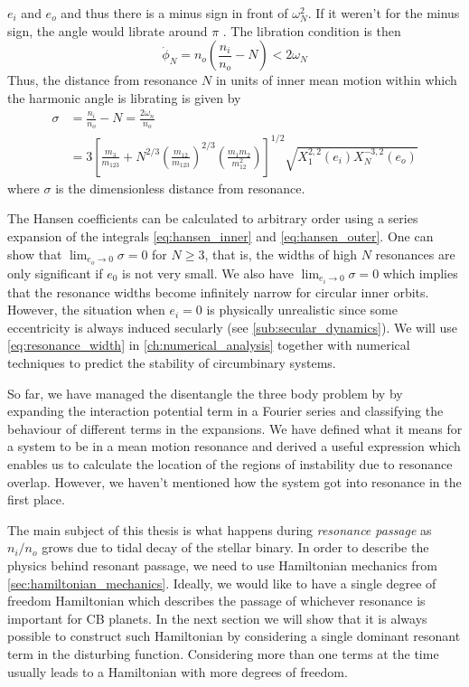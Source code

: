 \documentclass[ twoside,openright,titlepage,numbers=noenddot,headinclude,%
                footinclude=true,cleardoublepage=empty,abstractoff, %
                BCOR=5mm,paper=a4,fontsize=11pt,%
                american,%
                ]{scrreprt}
\begin{document}
$e_i$ and $e_o$ and thus there is a minus sign in front
of $\omega_N^2$. If it weren't for the minus sign, the 
angle would librate around $\pi$ \cite{Mardling2013}.
The libration condition is then
\begin{equation}
    \dot{\phi}_N=n_o\left( \frac{n_i}{n_o} -N\right)<2\omega_N
\end{equation}
Thus, the distance from resonance $N$ in units of inner mean motion
within which the harmonic angle is librating is given by
\begin{equation}
    \begin{aligned}
        \sigma&=\frac{n_i}{n_o} -N= \frac{2\omega_n}{n_o}\\ 
        &= 3\left[ \frac{m_3}{m_{123}} +
    N^{2/3}\left( \frac{m_{12}}{m_{123}}
        \right)^{2/3}\left( \frac{m_1m_2}{m_{12}^2} \right)\right]^{1/2}
        \sqrt{X^{2,2}_1(e_i)X^{-3,2}_N(e_o)}
    \end{aligned}
    \label{eq:resonance_width}
\end{equation}
where $\sigma$ is the dimensionless distance from resonance. 

The Hansen
coefficients can be calculated to arbitrary order using a series expansion
of the integrals \ref{eq:hansen_inner} and \ref{eq:hansen_outer}. One can
show that $\lim_{e_o\rightarrow 0}\sigma=0$ for $N\geq 3$, that is, the 
widths of high $N$ resonances are only significant if $e_0$ is not very
small. We also have $\lim_{e_i\rightarrow 0}\sigma=0$ which implies that
the resonance widths become infinitely narrow for circular inner orbits.
However, the situation when $e_i=0$ is physically unrealistic since some
eccentricity is always induced secularly (see \cref{sub:secular_dynamics}).
We will use \cref{eq:resonance_width} in 
\cref{ch:numerical_analysis} together with numerical techniques to predict the
stability of circumbinary systems.

So far, we have managed the disentangle the three body problem by
by expanding the interaction potential term in a Fourier series and 
classifying the behaviour of different terms in the expansions. We have
defined what it means for a system to be in a mean motion resonance and
derived a useful expression which enables us to calculate the location of 
the regions of instability due to resonance overlap. However, we haven't
mentioned how the system got into resonance in the first place. 

The main
subject of this thesis is what happens during  \emph{resonance
passage} as $n_i/n_o$ grows due to tidal decay of the stellar binary.
In order to describe the physics behind resonant passage, we need to use
Hamiltonian mechanics from \cref{sec:hamiltonian_mechanics}. Ideally, we
would like to have a single degree of freedom Hamiltonian which describes
the passage of whichever resonance is important for CB planets.
In the next section we will show that it is always possible to construct 
such  Hamiltonian by considering a single dominant resonant term in 
the disturbing function. Considering more than one terms at the time
usually leads to a Hamiltonian with more degrees of freedom.
\end{document}
